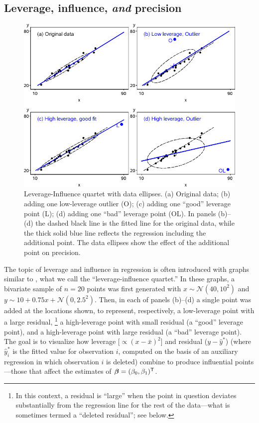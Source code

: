 \subsection{Leverage, influence, \emph{and} precision}

\begin{figure}[htb!]
  \centering
  \includegraphics[width=.9\textwidth,clip]{fig/levdemo21}
  \caption{Leverage-Influence quartet with data ellipses. (a) Original data;
  (b) adding one low-leverage outlier (O); (c) adding one ``good'' leverage point (L);
  (d) adding one ``bad'' leverage point (OL).
  In panels (b)--(d) the dashed black line is the fitted line for the original
  data, while the thick solid blue line reflects the  regression including the additional point.
  The data ellipses show the effect of the additional point on precision.}%
  \label{fig:levdemo21}
\end{figure}

The topic of leverage and influence in regression is often introduced with graphs
similar to , what we call
the ``leverage-influence quartet.''
In these graphs, a bivariate sample of $n=20$ points was first generated
with $x \sim \mathcal{N}(40, 10^2)$ and $y \sim 10 +  0.75 x + \mathcal{N}(0, 2.5^2)$.
Then, in each of
panels (b)--(d) a single point was added at the locations shown, to represent, respectively,
a low-leverage point with a large residual,%
\footnote{In this context, a residual is ``large'' when the point in question deviates substantially from the
regression line for the rest of the data---what is sometimes termed a ``deleted residual''; see below.} 
a high-leverage point with small residual
(a ``good'' leverage point), and a high-leverage point with large residual
(a ``bad'' leverage point).  The goal is to visualize how leverage [$\propto (x-\bar{x})^2$] and
residual ($y - \hat{y}^{*}$) (where $\hat{y}^{*}_{i}$ is the fitted value for observation $i$, computed on the basis of an auxiliary regression in which observation $i$ is deleted) combine to produce influential points---those that affect
the estimates of $\bm{\beta} = (\beta_0 , \beta_1)^\mathsf{T}$.


